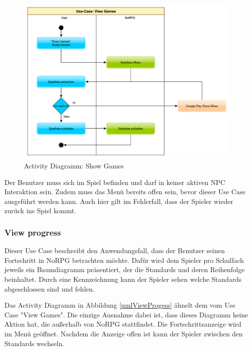 			\begin{figure}[htbp]
				\centering 
				\label{umlShowGames}
				\includegraphics[width=12cm]{pics/ShowGames.pdf}
				\caption{Activity Diagramm: Show Games}
			\end{figure}

			Der Benutzer muss sich im Spiel befinden und darf in keiner aktiven \ac{NPC} Interaktion sein. Zudem muss das Menü bereits offen sein, bevor dieser Use Case ausgeführt werden kann. Auch hier gilt im Fehlerfall, dass der Spieler wieder zurück ins Spiel kommt.
	
		\subsubsection{View progress}
			Dieser Use Case beschreibt den Anwendungsfall, dass der Benutzer seinen Fortschritt in NoRPG betrachten möchte. Dafür wird dem Spieler pro Schulfach jeweils ein Baumdiagramm präsentiert, der die Standards und deren Reihenfolge beinhaltet. Durch eine Kennzeichnung kann der Spieler sehen welche Standards abgeschlossen sind und fehlen.  
			
			Das Activity Diagramm in Abbildung \ref{umlViewProgess} ähnelt dem vom Use Case "View Games". Die einzige Ausnahme dabei ist, dass dieses Diagramm keine Aktion hat, die außerhalb von NoRPG stattfindet. Die Fortschrittsanzeige wird im Menü geöffnet. Nachdem die Anzeige offen ist kann der Spieler zwischen den Standards wechseln.
			
